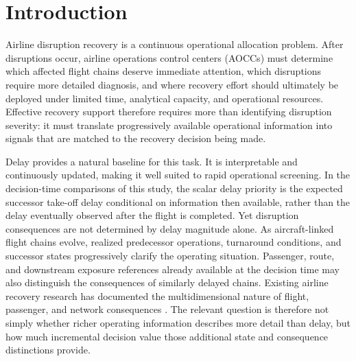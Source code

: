 \section{Introduction}
\label{sec:introduction}

Airline disruption recovery is a continuous operational allocation problem. After disruptions occur, airline operations control centers (AOCCs) must determine which affected flight chains deserve immediate attention, which disruptions require more detailed diagnosis, and where recovery effort should ultimately be deployed under limited time, analytical capacity, and operational resources. Effective recovery support therefore requires more than identifying disruption severity: it must translate progressively available operational information into signals that are matched to the recovery decision being made.

Delay provides a natural baseline for this task. It is interpretable and continuously updated, making it well suited to rapid operational screening. In the decision-time comparisons of this study, the scalar delay priority is the expected successor take-off delay conditional on information then available, rather than the delay eventually observed after the flight is completed. Yet disruption consequences are not determined by delay magnitude alone. As aircraft-linked flight chains evolve, realized predecessor operations, turnaround conditions, and successor states progressively clarify the operating situation. Passenger, route, and downstream exposure references already available at the decision time may also distinguish the consequences of similarly delayed chains. Existing airline recovery research has documented the multidimensional nature of flight, passenger, and network consequences
\citep{bratuFlightOperationsRecovery2006,arikanIntegratedAircraftPassenger2016,clausenDisruptionManagementAirline2010,hassanAirlineDisruptionManagement2021}.
The relevant question is therefore not simply whether richer operating information describes more detail than delay, but how much incremental decision value those additional state and consequence distinctions provide.

